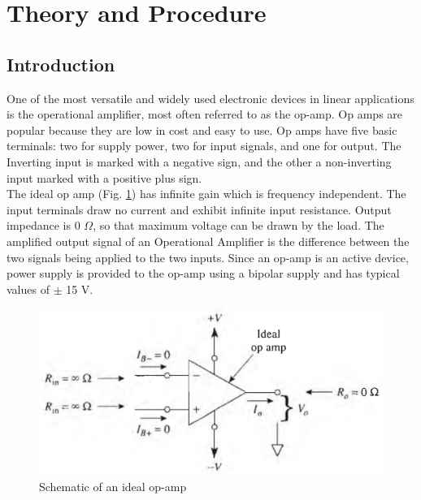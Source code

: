 \section{Theory and Procedure}



\subsection*{Introduction}

One of the most versatile and widely used electronic devices in linear applications is the operational amplifier, most often referred to as the op-amp. Op amps are popular because they are low in cost and easy to use. Op amps have five basic terminals: two for supply power, two for input signals, and one for output. The Inverting input is marked with a negative sign, and the other a non-inverting input marked with a positive plus sign.\\

The ideal op amp (Fig. \ref{fig:0}) has infinite gain which is frequency independent. The input terminals draw no current and exhibit infinite input resistance. Output impedance is 0 $\Omega$, so that maximum voltage can be drawn by the load.
The amplified output signal of an Operational Amplifier is the difference between the two signals being applied to the two inputs. Since an op-amp is an active device,  power supply is provided to the op-amp using a bipolar supply and has typical values of $\pm$ 15 V.\\

\begin{figure}[H]
    \centering
    \includegraphics[width=0.90\columnwidth]{images/ideal.png}
    \caption{Schematic of an ideal op-amp\\}
    \label{fig:0}
\end{figure}

